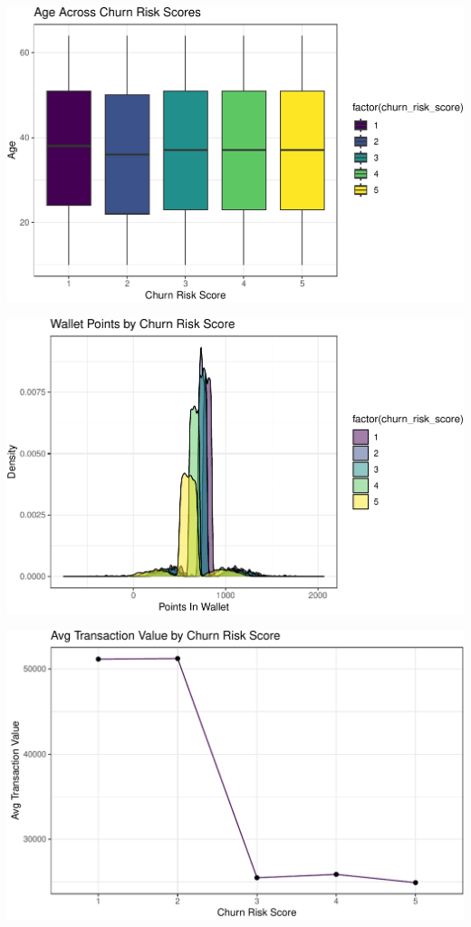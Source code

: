 \documentclass[
  letterpaper,
  DIV=11,
  numbers=noendperiod]{scrartcl}
\begin{document}
\begin{center}
\includegraphics{FPCP4_files/figure-pdf/unnamed-chunk-20-1.pdf}
\end{center}

\begin{center}
\includegraphics{FPCP4_files/figure-pdf/unnamed-chunk-21-1.pdf}
\end{center}

\begin{center}
\includegraphics{FPCP4_files/figure-pdf/unnamed-chunk-22-1.pdf}
\end{center}
\end{document}
